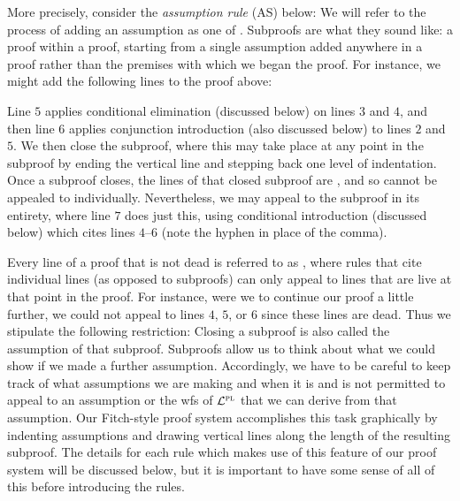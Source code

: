 More precisely, consider the \textit{assumption rule} (AS) below:
We will refer to the process of adding an assumption as one of .
Subproofs are what they sound like: a proof within a proof, starting from a single assumption added anywhere in a proof rather than the premises with which we began the proof.
For instance, we might add the following lines to the proof above:
\begin{fitchproof}
   \pr{}
   \pr{}
   
  \open
     \as{}
     
     
  \close
   
\end{fitchproof}
Line $5$ applies conditional elimination (discussed below) on lines $3$ and $4$, and then line $6$ applies conjunction introduction (also discussed below) to lines $2$ and $5$.
We then close the subproof, where this may take place at any point in the subproof by ending the vertical line and stepping back one level of indentation.
Once a subproof closes, the lines of that closed subproof are , and so cannot be appealed to individually.
Nevertheless, we may appeal to the subproof in its entirety, where line $7$ does just this, using conditional introduction (discussed below) which cites lines $4$--$6$ (note the hyphen in place of the comma).

Every line of a proof that is not dead is referred to as , where rules that cite individual lines (as opposed to subproofs) can only appeal to lines that are live at that point in the proof.
For instance, were we to continue our proof a little further, we could not appeal to lines $4$, $5$, or $6$ since these lines are dead.
Thus we stipulate the following restriction:
Closing a subproof is also called  the assumption of that subproof.
Subproofs allow us to think about what we could show if we made a further assumption.
Accordingly, we have to be careful to keep track of what assumptions we are making and when it is and is not permitted to appeal to an assumption or the wfs of $\mathcal{L}^{\textsc{pl}}$ that we can derive from that assumption.
Our Fitch-style proof system accomplishes this task graphically by indenting assumptions and drawing vertical lines along the length of the resulting subproof.
The details for each rule which makes use of this feature of our proof system will be discussed below, but it is important to have some sense of all of this before introducing the rules.





